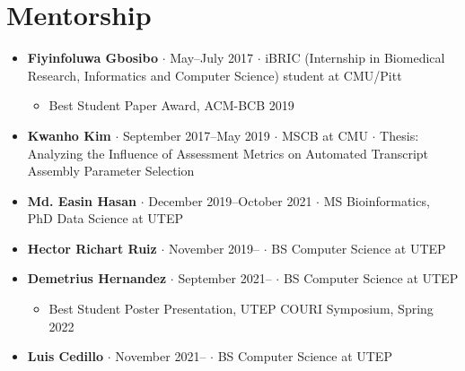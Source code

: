 \documentclass[10pt,letterpaper]{article}
\newcommand{\bigdot}{$\cdot$\xspace}
\begin{document}
\section*{Mentorship}
\begin{itemize}[leftmargin=*,labelindent=5pt,itemindent=-15pt]
\item \textbf{Fiyinfoluwa Gbosibo} \bigdot May--July 2017 \bigdot iBRIC (Internship in Biomedical Research, Informatics and Computer Science) student at CMU/Pitt
\begin{itemize}
\item Best Student Paper Award, ACM-BCB 2019
\end{itemize}

\item \textbf{Kwanho Kim} \bigdot September 2017--May 2019 \bigdot MSCB at CMU \bigdot Thesis: Analyzing the Influence of Assessment Metrics on Automated Transcript Assembly Parameter Selection

\item \textbf{Md. Easin Hasan} \bigdot December 2019--October 2021 \bigdot MS Bioinformatics, PhD Data Science at UTEP

\item \textbf{Hector Richart Ruiz} \bigdot November 2019-- \bigdot BS Computer Science at UTEP

\item \textbf{Demetrius Hernandez} \bigdot September 2021-- \bigdot BS Computer Science at UTEP 
\begin{itemize}
\item Best Student Poster Presentation, UTEP COURI Symposium, Spring 2022 
\end{itemize}

\item \textbf{Luis Cedillo} \bigdot November 2021-- \bigdot BS Computer Science at UTEP
\end{itemize}


\end{document}
